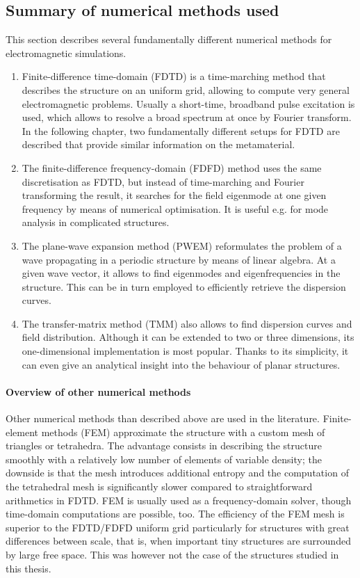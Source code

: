 \subsection{Summary of numerical methods used} %
This section describes several fundamentally different numerical methods for electromagnetic simulations. 
\begin{enumerate}
\item{Finite-difference time-domain (FDTD) is a time-marching method that describes the structure on an uniform grid, allowing to compute very general electromagnetic problems. Usually a short-time, broadband pulse excitation is used, which allows to resolve a broad spectrum at once by Fourier transform. In the following chapter, two fundamentally different setups for FDTD are described that provide similar information on the metamaterial.} 
\item{The finite-difference frequency-domain (FDFD) method uses the same discretisation as FDTD, but instead of time-marching and Fourier transforming the result, it searches for the field eigenmode at one given frequency by means of numerical optimisation. It is useful e.g. for mode analysis in complicated structures.} 
\item{The plane-wave expansion method (PWEM) reformulates the problem of a wave propagating in a periodic structure by means of linear algebra. At a given wave vector, it allows to find eigenmodes and eigenfrequencies in the structure. This can be in turn employed to efficiently retrieve the dispersion curves.} 
\item{The transfer-matrix method (TMM) also allows to find dispersion curves and field distribution. Although it can be extended to two or three dimensions, its one-dimensional implementation is most popular. Thanks to its simplicity, it can even give an analytical insight into the behaviour of planar structures.} 
\end{enumerate}

\paragraph{Overview of other numerical methods} %
Other numerical methods than described above are used in the literature.
Finite-element methods (FEM) approximate the structure with a custom mesh of triangles or tetrahedra. The advantage consists in describing the structure smoothly with a relatively low number of elements of variable density; the downside is that the mesh introduces additional entropy and the computation of the tetrahedral mesh is significantly slower compared to straightforward arithmetics in FDTD. FEM is usually used as a frequency-domain solver, though time-domain computations are possible, too. The efficiency of the FEM mesh is superior to the FDTD/FDFD uniform grid particularly for structures with great differences between scale, that is, when important tiny structures are surrounded by large free space. This was however not the case of the structures studied in this thesis.

